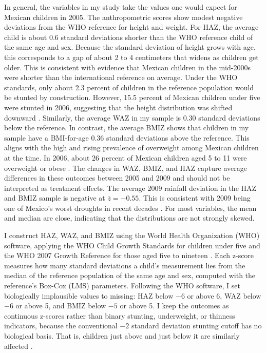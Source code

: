 In general, the variables in my study take the values one would expect for Mexican children in 2005. The anthropometric scores show modest negative deviations from the WHO reference for height and weight. For HAZ, the average child is about 0.6 standard deviations shorter than the WHO reference child of the same age and sex. Because the standard deviation of height grows with age, this corresponds to a gap of about 2 to 4 centimeters that widens as children get older. This is consistent with evidence that Mexican children in the mid-2000s were shorter than the international reference on average. Under the WHO standards, only about 2.3 percent of children in the reference population would be stunted by construction. However, 15.5 percent of Mexican children under five were stunted in 2006, suggesting that the height distribution was shifted downward \parencite{gonzalez-decossioChildMalnutritionMexico2009}. Similarly, the average WAZ in my sample is 0.30 standard deviations below the reference. In contrast, the average BMIZ shows that children in my sample have a BMI-for-age 0.36 standard deviations above the reference. This aligns with the high and rising prevalence of overweight among Mexican children at the time. In 2006, about 26 percent of Mexican children aged 5 to 11 were overweight or obese \parencite{shamah-levyResultadosNutricionENSANUT2007}. The changes in WAZ, BMIZ, and HAZ capture average differences in these outcomes between 2005 and 2009 and should not be interpreted as treatment effects. The average 2009 rainfall deviation in the HAZ and BMIZ sample is negative at $\bar{z} = -0.55$. This is consistent with 2009 being one of Mexico's worst droughts in recent decades \parencite{davydova-belitskayaMexico2010}. For most variables, the mean and median are close, indicating that the distributions are not strongly skewed.

I construct HAZ, WAZ, and BMIZ using the World Health Organization (WHO) software, applying the WHO Child Growth Standards for children under five and the WHO 2007 Growth Reference for those aged five to nineteen \parencite{whomulticentregrowthreferencestudygroupWHOChildGrowth2006,deonisDevelopmentWHOGrowth2007}. Each z-score measures how many standard deviations a child's measurement lies from the median of the reference population of the same age and sex, computed with the reference's Box-Cox (LMS) parameters. Following the WHO software, I set biologically implausible values to missing: HAZ below $-6$ or above 6, WAZ below $-6$ or above 5, and BMIZ below $-5$ or above 5. I keep the outcomes as continuous z-scores rather than binary stunting, underweight, or thinness indicators, because the conventional $-2$ standard deviation stunting cutoff has no biological basis. That is, children just above and just below it are similarly affected \parencite{perumalUseMisuseStunting2018}.

